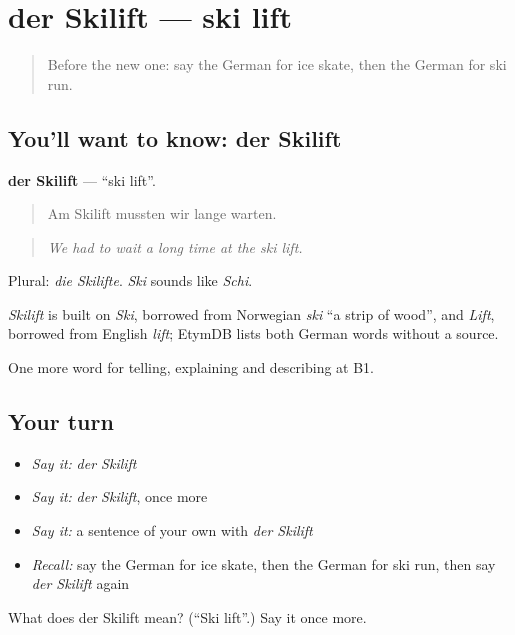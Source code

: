 \section[der Skilift]{der Skilift — ski lift}

\label{lesson:GE-C512-skilift}



\begin{quote}
Before the new one: say the German for ice skate, then the German for ski run.
\end{quote}

\subsection*{You'll want to know: der Skilift}
\textbf{der Skilift} — \textquotedblleft{}ski lift\textquotedblright{}.

\begin{quote}
Am Skilift mussten wir lange warten.
\end{quote}

\begin{quote}
\emph{We had to wait a long time at the ski lift.}
\end{quote}

Plural: \emph{die Skilifte}. \emph{Ski} sounds like \emph{Schi}.

\begin{cousinweb}
\emph{Skilift} is built on \emph{Ski}, borrowed from Norwegian \emph{ski} \textquotedblleft{}a strip of wood\textquotedblright{}, and \emph{Lift}, borrowed from English \emph{lift}; EtymDB lists both German words without a source.
\end{cousinweb}

\begin{grammarlens}[title={What you've built}]
One more word for telling, explaining and describing at B1.
\end{grammarlens}

\subsection*{Your turn}
\begin{itemize}
\raggedright
  \item \emph{Say it:} \emph{der Skilift}
  \item \emph{Say it:} \emph{der Skilift}, once more
  \item \emph{Say it:} a sentence of your own with \emph{der Skilift}
  \item \emph{Recall:} say the German for ice skate, then the German for ski run, then say \emph{der Skilift} again
\end{itemize}

\begin{tcolorbox}[breakable,colback=teal!4,colframe=teal!35!black,title={Before you move on}]
What does der Skilift mean? (\textquotedblleft{}Ski lift\textquotedblright{}.) Say it once more.
\end{tcolorbox}
